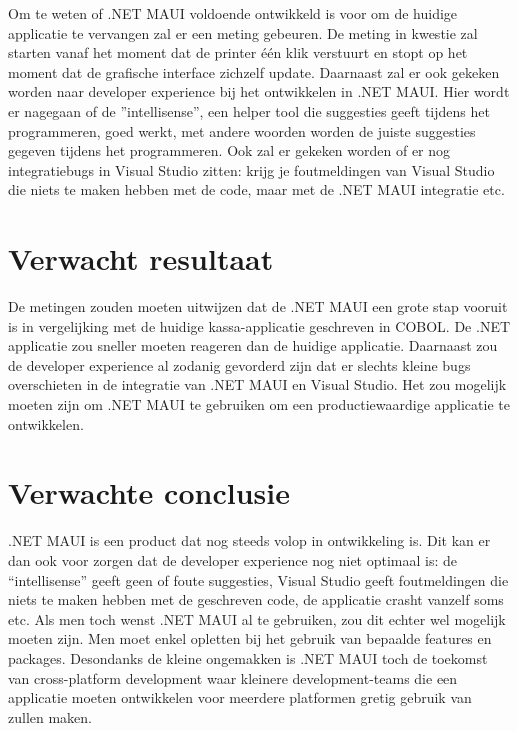Om te weten of .NET MAUI voldoende ontwikkeld is voor om de huidige applicatie te vervangen zal er een meting gebeuren. De meting in kwestie zal starten vanaf het moment dat de printer één klik verstuurt en stopt op het moment dat de grafische interface zichzelf update. 
Daarnaast zal er ook gekeken worden naar developer experience bij het ontwikkelen in .NET MAUI. Hier wordt er nagegaan of de ”intellisense”, een helper tool die suggesties geeft tijdens het programmeren, goed werkt, met andere woorden worden de juiste suggesties gegeven tijdens het programmeren. Ook zal er gekeken worden of er nog integratiebugs in Visual Studio zitten: krijg je foutmeldingen van Visual Studio die niets te maken hebben met de code, maar met de .NET MAUI integratie etc.

\section{Verwacht resultaat}%
\label{sec:verwachte_resultaten}

De metingen zouden moeten uitwijzen dat de .NET MAUI een grote stap vooruit is in vergelijking met de huidige kassa-applicatie geschreven in COBOL. De .NET applicatie zou sneller moeten reageren dan de huidige applicatie.
Daarnaast zou de developer experience al zodanig gevorderd zijn dat er slechts kleine bugs overschieten in de integratie van .NET MAUI en Visual Studio. Het zou mogelijk moeten zijn om .NET MAUI te gebruiken om een productiewaardige applicatie te ontwikkelen.

\section{Verwachte conclusie}
\label{sec:verwachte_conclusie}

.NET MAUI is een product dat nog steeds volop in ontwikkeling is. Dit kan er dan ook voor zorgen dat de developer experience nog niet optimaal is: de “intellisense” geeft geen of foute suggesties, Visual Studio geeft foutmeldingen die niets te maken hebben met de geschreven code, de applicatie crasht vanzelf soms etc. Als men toch wenst .NET MAUI al te gebruiken, zou dit echter wel mogelijk moeten zijn. Men moet enkel opletten bij het gebruik van bepaalde features en packages.
Desondanks de kleine ongemakken is .NET MAUI toch de toekomst van cross-platform development waar kleinere development-teams die een applicatie moeten ontwikkelen voor meerdere platformen gretig gebruik van zullen maken.